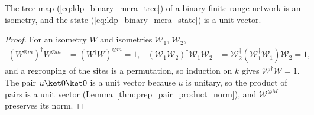 \begin{lemma}
    \label{lem:ldp_binary_mera_norm}
    \leanok
    The tree map (\ref{eq:ldp_binary_mera_tree}) of a binary finite-range
    network is an isometry, and the state (\ref{eq:ldp_binary_mera_state})
    is a unit vector.
\end{lemma}
\begin{proof}
    \leanok
    For an isometry $W$ and isometries $\mathcal W_1$, $\mathcal W_2$,
    \begin{align*}
        (W^{\otimes m})^\dagger W^{\otimes m}
         & =(W^\dagger W)^{\otimes m}=1,
         &
        (\mathcal W_1\mathcal W_2)^\dagger\mathcal W_1\mathcal W_2
         & =\mathcal W_2^\dagger(\mathcal W_1^\dagger\mathcal W_1)\mathcal W_2
        =1,
    \end{align*}
    and a regrouping of the sites is a permutation, so induction on $k$ gives
    $\mathcal W^\dagger\mathcal W=1$.
    The pair $u\ket0\ket0$ is a unit vector because $u$ is unitary, so the
    product of pairs is a unit vector
    (Lemma~\ref{thm:prep_pair_product_norm}), and $\mathcal W^{\otimes M}$
    preserves its norm.
\end{proof}

